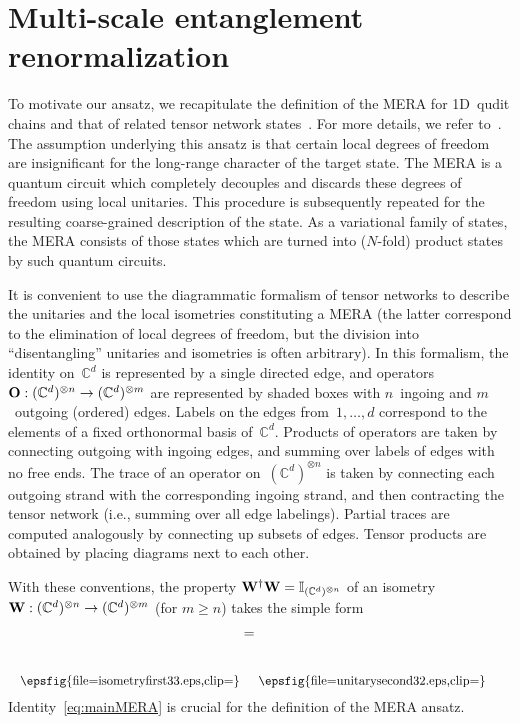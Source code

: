 \documentclass[floats,prb,twocolumn]{revtex4}
\newcommand{\id}{\mathbb{I}}
\def\id{\mathbb{I}}
\newcommand*{\Xsingleoperator}{{\bf O}}
\newcommand*{\Xisometry}{{\bf W}}
\newcommand*{\unitarysecond}{\raisebox{-37.443pt}{\epsfig{file=unitarysecond32.eps,clip=}}}
\newcommand*{\isometryfirst}{\raisebox{-37.443pt}{\epsfig{file=isometryfirst33.eps,clip=}}}
\begin{document}
\section{Multi-scale entanglement renormalization\label{sec:MERA}}
To motivate our ansatz, we  recapitulate the definition of  the MERA for 1D~qudit chains and that of
related tensor network states~\cite{Vidal07,Vidal08}. For more details, we refer to~\cite{evenblyvidal09}.  The  assumption underlying this ansatz is that certain local degrees of freedom are insignificant for the long-range character of the target state.  The MERA is a quantum circuit which completely decouples and discards these degrees of freedom using local unitaries. This procedure is subsequently repeated for the resulting  coarse-grained description of the state. As a variational family of states, the MERA consists of those states  which are turned into ($N$-fold) product states by such quantum circuits. 


It is convenient to use the diagrammatic formalism of tensor networks to describe the  unitaries and the local isometries  constituting a MERA (the latter correspond to the elimination of local degrees of freedom, but the division into ``disentangling'' unitaries and isometries is often arbitrary). In this formalism, 
the identity on~$\mathbb{C}^d$ is represented by a single directed edge, and operators $\Xsingleoperator:(\mathbb{C}^d)^{\otimes n}\rightarrow (\mathbb{C}^d)^{\otimes m}$ are represented by shaded boxes with $n$~ingoing  and $m$~outgoing (ordered) edges. Labels on the edges from~$1,\ldots,d$ correspond to the elements of a fixed orthonormal basis of~$\mathbb{C}^d$. Products of operators are taken by connecting outgoing with ingoing edges, and summing over labels of  edges
with no free ends. The trace of an operator on~$(\mathbb{C}^d)^{\otimes n}$ is taken by connecting each outgoing strand with the corresponding ingoing strand, and then contracting the tensor network (i.e., summing over all edge labelings). Partial traces are computed analogously by connecting up subsets of edges. Tensor products are obtained by placing diagrams next to each other. 

With these conventions, the property
$\Xisometry^\dagger \Xisometry =\id_{(\mathbb{C}^d)^{\otimes n}}$ of an isometry  $\Xisometry: (\mathbb{C}^d)^{\otimes n}\rightarrow (\mathbb{C}^d)^{\otimes m}$ (for $m\geq n$) takes the simple form
\begin{align} 
\scalebox{0.9}{\isometryfirst}&=\scalebox{0.9}{\unitarysecond} \label{eq:mainMERA}
\end{align} 
Identity~\eqref{eq:mainMERA} is crucial for the definition of the MERA ansatz.
\end{document}
